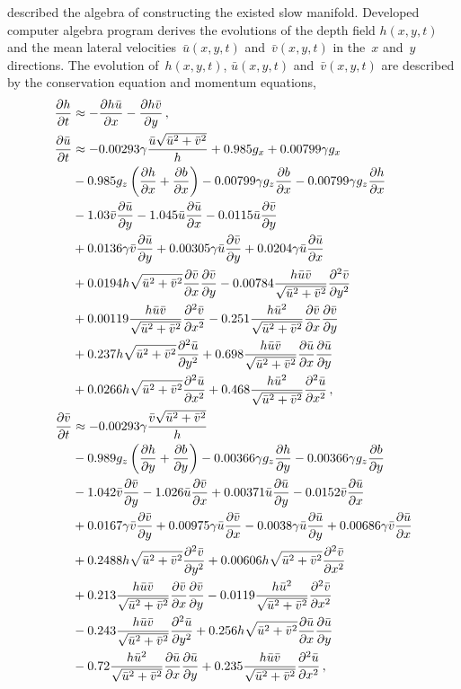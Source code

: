 \documentclass[12pt,a5paper]{article}
\newcommand{\uu}{{\bar u}}
\newcommand{\vv}{{\bar v}}
\begin{document}
\cite{Roberts:2008fk} described the algebra of constructing the existed slow manifold. Developed computer algebra program derives the evolutions of the depth field $h(x,y,t)$ and the mean lateral velocities~$\bar u(x,y,t)$ and~$\bar v(x,y,t)$ in the~$x$ and~$y$ directions. The evolution of~$h(x,y,t)$, $\bar u(x,y,t)$ and~$\bar v(x,y,t)$ are described by the conservation equation and momentum equations,
\begin{align}
\frac{\partial h}{\partial t}&
\approx-\frac{\partial h\bar u}{\partial x}-\frac{\partial h\bar v}{\partial y}\,,\label{smag:h}
\\
\frac{\partial\bar u}{\partial t}&
\approx-0.00293\gamma\frac{\bar u\sqrt{\bar u^2+\bar v^2}}{h}+0.985g_x+0.00799\gamma g_x
\nonumber\\&
-0.985g_z\left(\frac{\partial h}{\partial x}+\frac{\partial b}{\partial x}\right)-0.00799\gamma g_z\D xb
-0.00799\gamma g_z\D xh
\nonumber\\&
-1.03\bar v\frac{\partial\bar u}{\partial y}-1.045\bar u\frac{\partial\bar u}{\partial x}-0.0115\uu\D{y}{\vv}
\nonumber\\&
+0.0136\gamma\vv\D{y}{\uu}+0.00305\gamma\uu\D{y}{\vv}+0.0204\gamma\uu\D{x}{\uu}
\nonumber\\&
+0.0194h\sqrt{\uu^2+\vv^2}\D x\vv\D y\vv-0.00784\frac{h\uu\vv}{\sqrt{\uu^2+\vv^2}}\DD{y}{\vv}
\nonumber\\&
+0.00119\frac{h\uu\vv}{\sqrt{\uu^2+\vv^2}}\DD x\vv-0.251\frac{h\uu^2}{\sqrt{\uu^2+\vv^2}}\D x\vv\D y\vv
\nonumber\\&
+0.237h\sqrt{\uu^2+\vv^2}\DD y\uu+0.698\frac{h\uu\vv}{\sqrt{\uu^2+\vv^2}}\D x\uu\D y\uu
\nonumber\\&
+0.0266h\sqrt{\uu^2+\vv^2}\DD x\uu+0.468\frac{h\uu^2}{\sqrt{\uu^2+\vv^2}}\DD x\uu\,,
\label{smag:u}
\\
\frac{\partial\bar v}{\partial t}&
\approx-0.00293\gamma\frac{\bar v\sqrt{\bar u^2+\bar v^2}}{h}
\nonumber\\&
-0.989g_z\left(\frac{\partial h}{\partial y}+\frac{\partial b}{\partial y}\right)
-0.00366\gamma g_z\D yh-0.00366\gamma g_z\D yb
\nonumber\\&
-1.042\bar v\frac{\partial\bar v}{\partial y}-1.026\bar u\frac{\partial\bar v}{\partial x}
+0.00371\uu\D y\uu-0.0152\vv\D x\uu
\nonumber\\&
+0.0167\gamma\vv\D y\vv+0.00975\gamma\uu\D x\vv-0.0038\gamma\uu\D y\uu+0.00686\gamma\vv\D x\uu
\nonumber\\&
+0.2488h\sqrt{\uu^2+\vv^2}\DD y\vv+0.00606h\sqrt{\uu^2+\vv^2}\DD x\vv
\nonumber\\&
+0.213\frac{h\uu\vv}{\sqrt{\uu^2+\vv^2}}\D x\vv\D y\vv-0.0119\frac{h\uu^2}{\sqrt{\uu^2+\vv^2}}\DD x\vv
\nonumber\\&
-0.243\frac{h\uu\vv}{\sqrt{\uu^2+\vv^2}}\DD y\uu+0.256h\sqrt{\uu^2+\vv^2}\D x\uu\D y\uu
\nonumber\\&
-0.72\frac{h\uu^2}{\sqrt{\uu^2+\vv^2}}\D x\uu\D y\uu+0.235\frac{h\uu\vv}{\sqrt{\uu^2+\vv^2}}\DD x\uu
\,,\label{smag:v}
\end{align}
\end{document}
